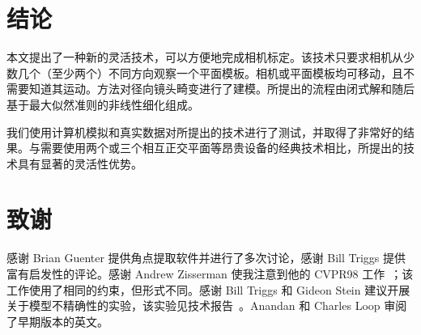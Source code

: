 \clearpage
\section{结论}\label{sec:conclusion}

本文提出了一种新的灵活技术，可以方便地完成相机标定。该技术只要求相机从少数几个（至少两个）不同方向观察一个平面模板。相机或平面模板均可移动，且不需要知道其运动。方法对径向镜头畸变进行了建模。所提出的流程由闭式解和随后基于最大似然准则的非线性细化组成。

我们使用计算机模拟和真实数据对所提出的技术进行了测试，并取得了非常好的结果。与需要使用两个或三个相互正交平面等昂贵设备的经典技术相比，所提出的技术具有显著的灵活性优势。

\section*{致谢}\label{sec:acknowledgment}

感谢 Brian Guenter 提供角点提取软件并进行了多次讨论，感谢 Bill Triggs 提供富有启发性的评论。感谢 Andrew Zisserman 使我注意到他的 CVPR98 工作~\cite{liebowitz1998metric}；该工作使用了相同的约束，但形式不同。感谢 Bill Triggs 和 Gideon Stein 建议开展关于模型不精确性的实验，该实验见技术报告~\cite{zhang1998flexible}。Anandan 和 Charles Loop 审阅了早期版本的英文。
